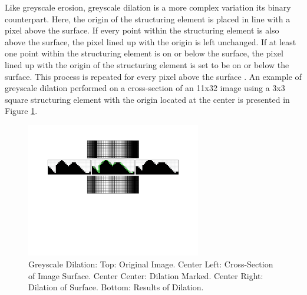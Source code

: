 \documentclass{sig-alternate}
\begin{document}
Like greyscale erosion, greyscale dilation is a more complex variation its binary counterpart. Here, the origin of the structuring element is placed in line with a pixel above the surface. If every point within the structuring element is also above the surface, the pixel lined up with the origin is left unchanged. If at least one point within the structuring element is on or below the surface, the pixel lined up with the origin of the structuring element is set to be on or below the surface. This process is repeated for every pixel above the surface \cite{MorphologyPaper:1987, MorphologyWiki}. An example of greyscale dilation performed on a cross-section of an 11x32 image using a 3x3 square structuring element with the origin located at the center is presented in Figure \ref{greyscale dilation figure}.
\begin{figure}
\centering
\includegraphics[width=3in,trim={0 4in 0 0},clip]{greyscale_dilation}
\caption{Greyscale Dilation: Top: Original Image. Center Left: Cross-Section of Image Surface. Center Center: Dilation Marked. Center Right: Dilation of Surface. Bottom: Results of Dilation.}
\label{greyscale dilation figure}
\end{figure}
\end{document}
